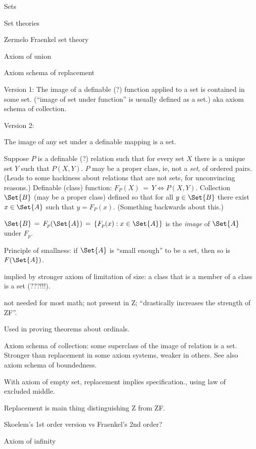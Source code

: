 \begin{plSection}{Sets}
\begin{plSection}{Set theories}
\begin{plSection}{Zermelo Fraenkel set theory}
\begin{plSection}{Axiom of union}
\end{plSection}%
\begin{plSection}{Axiom schema of replacement}
\label{sec:Axiom-schema-of-replacement}

Version 1: 
The image of a definable (?) function applied to a set
is contained in some set.\cite{wiki:AxiomSchemaOfReplacement}
(``image of set under function'' is usually defined as a set.)
aka axiom schema of collection.

Version 2: 

The image of any set under a definable mapping is a set.

Suppose $P$ is a definable (?) relation such that for every
set $X$ there is a unique set $Y$ such that $P(X,Y)$.
$P$ may be a proper class\cite{wiki:ClassSetTheory}, 
ie, not a \textit{set}, of ordered pairs. 
(Leads to some hackiness about relations that are not sets,
for unconvincing reasons\cite{wiki:BinaryRelation}.)
Definable (class) function: $F_P(X)\,=\,Y \iff P(X,Y)$.
Collection $\Set{B}$ (may be a proper class)
defined so that for all $y\in\Set{B}$ there exist $x \in \Set{A}$
such that $y=F_P(x)$.
(Something backwards about this.)

$\Set{B}\,=\,F_p(\Set{A}) \,=\, \left\{F_p(x) : x \in \Set{A}\right\}$ 
is the \textsl{image} of $\Set{A}$ under $F_p$.

Principle of smallness: if $\Set{A}$ is 
``small enough'' to be a set,
then so is $F(\Set{A})$.

 implied by stronger
axiom of limitation of 
size\cite{wiki:AxiomOfLimitationOfSize}:
a class that is a member of a class is a set (???!!!).

 not needed for most math;
not present in \textsf{Z};
``drastically increases the strength of \textsf{ZF}''.

Used in proving theorems about ordinals.

Axiom schema of collection: some superclass of 
the image of relation is a set.
Stronger than replacement
in some axiom systems, weaker in others.
See also axiom schema of boundedness.

With axiom of empty set, replacement implies specification.,
using law of excluded middle.

Replacement is main thing distinguishing \textsf{Z}
from \textsf{ZF}.

Skoelem's 1st order version vs Fraenkel's $2$nd order?
\end{plSection}%
\begin{plSection}{Axiom of infinity}
\label{sec:Axiom-of-infinity}


\end{plSection}
\end{plSection}
\end{plSection}
\end{plSection}
